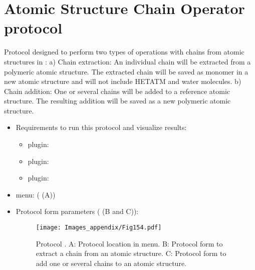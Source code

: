 \section{Atomic Structure Chain Operator protocol}
\label{app:atomStructUtilsOperatorProtocol}%
Protocol designed to perform two types of operations with chains from atomic structures in \scipion: a) Chain extraction: An individual chain will be extracted from a polymeric atomic structure. The extracted chain will be saved as monomer in a new atomic structure and will not include HETATM and water molecules. b) Chain addition: One or several chains will be added to a reference atomic structure. The resulting addition will be saved as a new polymeric atomic structure. 

\begin{itemize}
 \item Requirements to run this protocol and visualize results:
    \begin{itemize}
        \item \scipion plugin: 
        \item \scipion plugin: 
        \item \scipion plugin: 
    \end{itemize}
 \item \scipion menu:
   ( (A))
  
 \item Protocol form parameters ( (B and C)):
 
 \begin{figure}[H]
     \centering 
     \captionsetup{width=.9\linewidth} 
     \texttt{[image: Images\_appendix/Fig154.pdf]}
     \caption{Protocol . A: Protocol location in \scipion menu. B: Protocol form to extract a chain from an atomic structure. C: Protocol form to add one or several chains to an atomic structure.}
     \label{fig:app_protocol_atomstructutils_operator_1}
    \end{figure}
    

\end{itemize}
